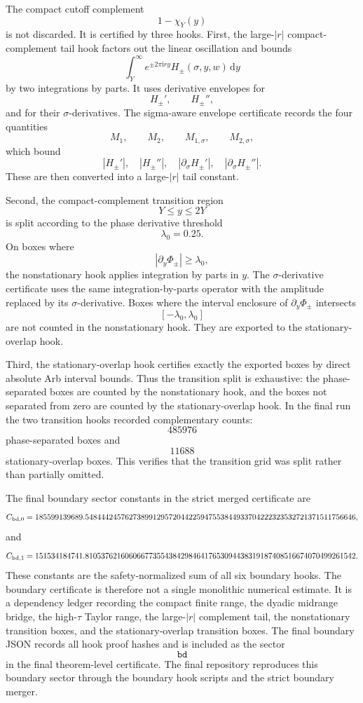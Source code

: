 \documentclass[11pt]{article}
\newcommand{\ii}{\mathrm{i}}
\newcommand{\dd}{\mathrm{d}}
\newcommand{\sig}{\sigma}
\newcommand{\tauh}{\tau}
\newcommand{\JSON}[1]{\texttt{#1}}
\begin{document}
The compact cutoff complement
\[
        1-\chi_Y(y)
\]
is not discarded.  It is certified by three hooks.  First, the large-\(|r|\)
compact-complement tail hook factors out the linear oscillation and bounds
\[
        \int_Y^\infty
        e^{\pm 2\pi\ii r y}H_\pm(\sig,y,w)
        \,\dd y
\]
by two integrations by parts.  It uses derivative envelopes for
\[
        H_\pm',
        \qquad
        H_\pm'',
\]
and for their \(\sig\)-derivatives.  The sigma-aware envelope certificate
records the four quantities
\[
        M_{1},
        \qquad
        M_{2},
        \qquad
        M_{1,\sig},
        \qquad
        M_{2,\sig},
\]
which bound
\[
        |H_\pm'|,
        \quad
        |H_\pm''|,
        \quad
        |\partial_\sig H_\pm'|,
        \quad
        |\partial_\sig H_\pm''|.
\]
These are then converted into a large-\(|r|\) tail constant.

Second, the compact-complement transition region
\[
        Y\le y\le2Y
\]
is split according to the phase derivative threshold
\[
        \lambda_0=0.25.
\]
On boxes where
\[
        |\partial_y\Phi_\pm|\ge\lambda_0,
\]
the nonstationary hook applies integration by parts in \(y\).  The
\(\sig\)-derivative certificate uses the same integration-by-parts operator
with the amplitude replaced by its \(\sig\)-derivative.  Boxes where the
interval enclosure of \(\partial_y\Phi_\pm\) intersects
\[
        [-\lambda_0,\lambda_0]
\]
are not counted in the nonstationary hook.  They are exported to the
stationary-overlap hook.

Third, the stationary-overlap hook certifies exactly the exported boxes by
direct absolute Arb interval bounds.  Thus the transition split is exhaustive:
the phase-separated boxes are counted by the nonstationary hook, and the boxes
not separated from zero are counted by the stationary-overlap hook.  In the
final run the two transition hooks recorded complementary counts:
\[
        485976
\]
phase-separated boxes and
\[
        11688
\]
stationary-overlap boxes.  This verifies that the transition grid was split
rather than partially omitted.

The final boundary sector constants in the strict merged certificate are
\[
        C_{{\rm bd},0}
        =
        185599139689.54844424576273899129572044225947553844933704222323532721371511756646,
\]
and
\[
        C_{{\rm bd},1}
        =
        151534184741.81053762160606677355438429846417653094438319187408516674070499261542.
\]
These constants are the safety-normalized sum of all six boundary hooks.  The
boundary certificate is therefore not a single monolithic numerical estimate.
It is a dependency ledger recording the compact finite range, the dyadic
midrange bridge, the high-\(\tauh\) Taylor range, the large-\(|r|\) complement
tail, the nonstationary transition boxes, and the stationary-overlap transition
boxes.  The final boundary JSON records all hook proof hashes and is included
as the sector
\[
        \JSON{bd}
\]
in the final theorem-level certificate.  The final repository reproduces this
boundary sector through the boundary hook scripts and the strict boundary
merger. 
\end{document}
